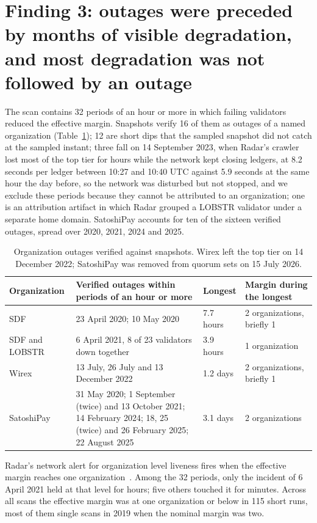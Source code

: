 \documentclass[11pt,a4paper]{article}
\begin{document}
\section{Finding 3: outages were preceded by months of visible degradation, and most degradation was not followed by an outage}
The scan contains 32 periods of an hour or more in which failing validators reduced the effective margin. Snapshots verify 16 of them as outages of a named organization (Table~\ref{tab:outages}); 12 are short dips that the sampled snapshot did not catch at the sampled instant; three fall on 14 September 2023, when Radar's crawler lost most of the top tier for hours while the network kept closing ledgers, at 8.2 seconds per ledger between 10:27 and 10:40 UTC against 5.9 seconds at the same hour the day before, so the network was disturbed but not stopped, and we exclude these periods because they cannot be attributed to an organization; one is an attribution artifact in which Radar grouped a LOBSTR validator under a separate home domain. SatoshiPay accounts for ten of the sixteen verified outages, spread over 2020, 2021, 2024 and 2025.

\begin{table}[h]
\centering
\small
\begin{tabular}{@{}lp{6.6cm}ll@{}}
\toprule
Organization & Verified outages within periods of an hour or more & Longest & Margin during the longest \\
\midrule
SDF & 23 April 2020; 10 May 2020 & 7.7 hours & 2 organizations, briefly 1 \\
SDF and LOBSTR & 6 April 2021, 8 of 23 validators down together & 3.9 hours & 1 organization \\
Wirex & 13 July, 26 July and 13 December 2022 & 1.2 days & 2 organizations, briefly 1 \\
SatoshiPay & 31 May 2020; 1 September (twice) and 13 October 2021; 14 February 2024; 18, 25 (twice) and 26 February 2025; 22 August 2025 & 3.1 days & 2 organizations \\
\bottomrule
\end{tabular}
\caption{Organization outages verified against snapshots. Wirex left the top tier on 14 December 2022; SatoshiPay was removed from quorum sets on 15 July 2026.}
\label{tab:outages}
\end{table}

Radar's network alert for organization level liveness fires when the effective margin reaches one organization~\cite{radar}. Among the 32 periods, only the incident of 6 April 2021 held at that level for hours; five others touched it for minutes. Across all scans the effective margin was at one organization or below in 115 short runs, most of them single scans in 2019 when the nominal margin was two.
\end{document}
